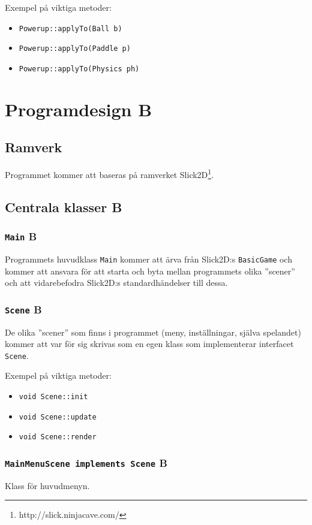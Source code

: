 \documentclass[a4paper,11pt]{article}
\begin{document}
\bigskip
\noindent Exempel på viktiga metoder:
\begin{itemize}
\item \texttt{Powerup::applyTo(Ball b)}
\item \texttt{Powerup::applyTo(Paddle p)}
\item \texttt{Powerup::applyTo(Physics ph)}
\end{itemize}

\section{Programdesign B}
\subsection{Ramverk}
Programmet kommer att baseras på ramverket Slick2D\footnote{http://slick.ninjacave.com/}.

\subsection{Centrala klasser B}
\subsubsection{\texttt{Main} B}
\noindent Programmets huvudklass \texttt{Main} kommer att ärva från
Slick2D:s \texttt{BasicGame} och kommer att ansvara för att starta och
byta mellan programmets olika ''scener'' och att vidarebefodra Slick2D:s
standardhändelser till dessa.

\subsubsection{\texttt{Scene} B}
\noindent De olika ''scener'' som finns i programmet (meny, inställningar,
själva spelandet) kommer att var för sig skrivas som en egen klass
som implementerar interfacet \texttt{Scene}.

\bigskip
\noindent Exempel på viktiga metoder:
\begin{itemize}
\item \texttt{void Scene::init}
\item \texttt{void Scene::update}
\item \texttt{void Scene::render}
\end{itemize}

\subsubsection{\texttt{MainMenuScene implements Scene} B}
\noindent Klass för huvudmenyn.
\end{document}

